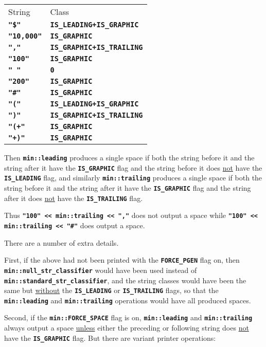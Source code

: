 \documentclass[12pt]{article}
\newcommand{\TT}[1]{{\tt \bfseries #1}}
\newcommand{\EOL}{\penalty \exhyphenpenalty}
\begin{document}
\begin{center}
\begin{tabular}{l@{~~~~~}l}
String & Class \\[2ex]
\TT{"\$"} & \TT{IS\_LEADING+IS\_GRAPHIC} \\
\TT{"10,000"} & \TT{IS\_GRAPHIC} \\
\TT{","} & \TT{IS\_GRAPHIC+IS\_TRAILING} \\
\TT{"100"} & \TT{IS\_GRAPHIC} \\
\TT{"~"} & \TT{0} \\
\TT{"200"} & \TT{IS\_GRAPHIC} \\
\TT{"\#"} & \TT{IS\_GRAPHIC} \\
\TT{"("} & \TT{IS\_LEADING+IS\_GRAPHIC} \\
\TT{")"} & \TT{IS\_GRAPHIC+IS\_TRAILING} \\
\TT{"(+"} & \TT{IS\_GRAPHIC} \\
\TT{"+)"} & \TT{IS\_GRAPHIC} \\
\end{tabular}
\end{center}

Then \TT{min::leading} produces a single
space if both the string before it and the string after it have
the \TT{IS\_\EOL GRAPHIC} flag and the string before it does
\underline{not} have the \TT{IS\_\EOL LEADING} flag, and
similarly \TT{min::trailing} produces a single
space if both the string before it and the string after it have
the \TT{IS\_\EOL GRAPHIC} flag and the string after it does
\underline{not} have the \TT{IS\_\EOL TRAILING} flag.

Thus \TT{"100" <{}< min::trailing <{}< ","} does not output a space
while \TT{"100" <{}< min::\EOL trail\-ing <{}< "\#"} does output a space.

There are a number of extra details.

First, if the above had not been printed with the \TT{FORCE\_\EOL PGEN}
flag on, then \TT{min::\EOL null\_\EOL str\_\EOL classifier} would have
been used instead of \TT{min::\EOL standard\_\EOL str\_\EOL classifier},
and the string classes would have been the same but \underline{without}
the \TT{IS\_\EOL LEADING} or \TT{IS\_\EOL TRAILING} flags, so that the
\TT{min::\EOL leading} and \TT{min::\EOL trailing} operations would have all
produced spaces.

Second, if the \TT{min::FORCE\_SPACE} flag is on, \TT{min::leading}
and \TT{min::trailing} always output a space \underline{unless}
either the preceding or following string does \underline{not} have
the \TT{IS\_\EOL GRAPHIC} flag.  But there are variant printer
operations:
\end{document}
